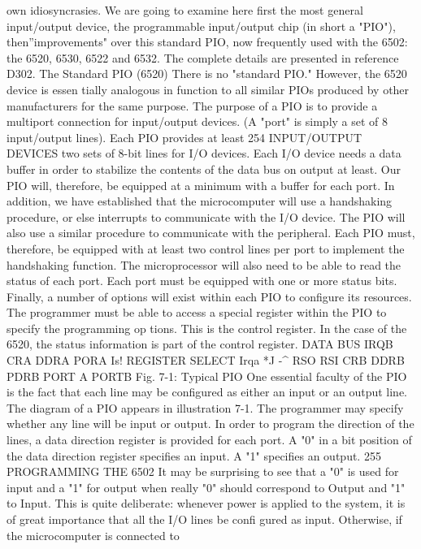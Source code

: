 \documentclass{book}
\begin{document}
own idiosyncrasies. We are going to examine here first the most
general input/output device, the programmable input/output chip
(in short a "PIO"), then''improvements" over this standard PIO,
now frequently used with the 6502: the 6520, 6530, 6522 and
6532. The complete details are presented in reference D302.
The Standard PIO (6520)
There is no "standard PIO." However, the 6520 device is essen
tially analogous in function to all similar PIOs produced by other
manufacturers for the same purpose. The purpose of a PIO is to
provide a multiport connection for input/output devices. (A "port"
is simply a set of 8 input/output lines). Each PIO provides at least
254
INPUT/OUTPUT DEVICES
two sets of 8-bit lines for I/O devices. Each I/O device needs a data
buffer in order to stabilize the contents of the data bus on output
at least. Our PIO will, therefore, be equipped at a minimum with
a buffer for each port.
In addition, we have established that the microcomputer will
use a handshaking procedure, or else interrupts to communicate
with the I/O device. The PIO will also use a similar procedure to
communicate with the peripheral. Each PIO must, therefore, be
equipped with at least two control lines per port to implement the
handshaking function.
The microprocessor will also need to be able to read the status
of each port. Each port must be equipped with one or more status
bits. Finally, a number of options will exist within each PIO to
configure its resources. The programmer must be able to access a
special register within the PIO to specify the programming op
tions. This is the control register. In the case of the 6520, the
status information is part of the control register.
DATA BUS
IRQB
CRA DDRA PORA
Is!
REGISTER
SELECT
Irqa
*J
-^
RSO
RSI
CRB DDRB PDRB
PORT A
PORTB
Fig. 7-1: Typical PIO
One essential faculty of the PIO is the fact that each line may
be configured as either an input or an output line. The diagram of
a PIO appears in illustration 7-1. The programmer may specify
whether any line will be input or output. In order to program the
direction of the lines, a data direction register is provided for each
port. A "0" in a bit position of the data direction register specifies
an input. A "1" specifies an output.
255
PROGRAMMING THE 6502
It may be surprising to see that a "0" is used for input and a "1"
for output when really "0" should correspond to Output and "1" to
Input. This is quite deliberate: whenever power is applied to the
system, it is of great importance that all the I/O lines be confi
gured as input. Otherwise, if the microcomputer is connected to
\end{document}

